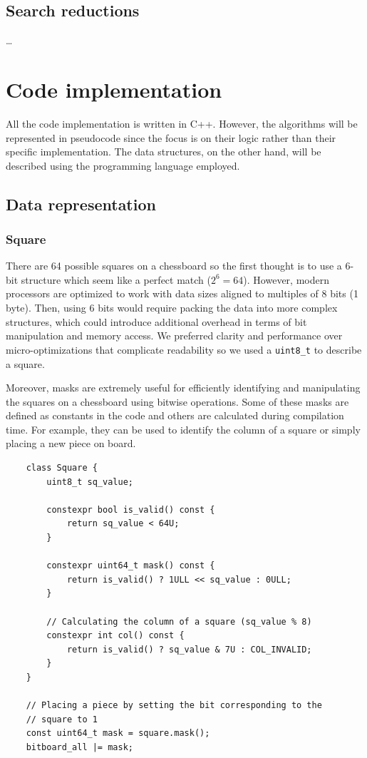 \subsection{Search reductions}

\ldots

\section{Code implementation}
\label{sec:code}

All the code implementation is written in C++. However, the algorithms will be represented in pseudocode since the focus is on their logic rather than their specific implementation. The data structures, on the other hand, will be described using the programming language employed.

\subsection{Data representation}

\subsubsection{Square}

There are 64 possible squares on a chessboard so the first thought is to use a 6-bit structure which seem like a perfect match ($2^6 = 64$). However, modern processors are optimized to work with data sizes aligned to multiples of 8 bits (1 byte). Then, using 6 bits would require packing the data into more complex structures, which could introduce additional overhead in terms of bit manipulation and memory access. We preferred clarity and performance over micro-optimizations that complicate readability so we used a \texttt{uint8\_t} to describe a square.

\vspace{1em}

\noindent Moreover, masks are extremely useful for efficiently identifying and manipulating the squares on a chessboard using bitwise operations. Some of these masks are defined as constants in the code and others are calculated during compilation time. For example, they can be used to identify the column of a square or simply placing a new piece on board.

\begin{lstlisting}
    class Square {
        uint8_t sq_value;

        constexpr bool is_valid() const {
            return sq_value < 64U;
        }

        constexpr uint64_t mask() const {
            return is_valid() ? 1ULL << sq_value : 0ULL;
        }

        // Calculating the column of a square (sq_value % 8)
        constexpr int col() const {
            return is_valid() ? sq_value & 7U : COL_INVALID;
        }
    }

    // Placing a piece by setting the bit corresponding to the
    // square to 1
    const uint64_t mask = square.mask();
    bitboard_all |= mask;
\end{lstlisting}

